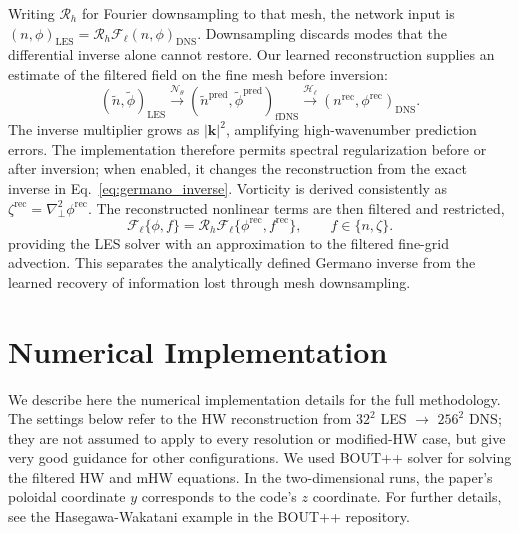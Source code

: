 \documentclass[authoryear,preprint,review,12pt]{elsarticle}
\begin{document}
Writing $\mathcal{R}_h$ for Fourier downsampling to that mesh, the network input is $(n,\phi)_{\mathrm{LES}}=\mathcal{R}_h\mathcal{F}_\ell(n,\phi)_{\mathrm{DNS}}$. Downsampling discards modes that the differential inverse alone cannot restore. Our learned reconstruction supplies an estimate of the filtered field on the fine mesh before inversion:
\begin{equation}
    (\widetilde{n},\widetilde{\phi})_{\mathrm{LES}}
    \xrightarrow{\mathcal{N}_\theta}
    (\widetilde n^{\mathrm{pred}},\widetilde\phi^{\mathrm{pred}})_{\mathrm{fDNS}}
    \xrightarrow{\mathcal{H}_\ell}
    (n^{\mathrm{rec}},\phi^{\mathrm{rec}})_{\mathrm{DNS}}.
    \label{eq:germano_learning_path}
\end{equation}
The inverse multiplier grows as $|\mathbf{k}|^2$, amplifying high-wavenumber prediction errors. The implementation therefore permits spectral regularization before or after inversion; when enabled, it changes the reconstruction from the exact inverse in Eq.~\eqref{eq:germano_inverse}. Vorticity is derived consistently as $\zeta^{\mathrm{rec}}=\nabla_\perp^2\phi^{\mathrm{rec}}$. The reconstructed nonlinear terms are then filtered and restricted,
\begin{equation}
    \mathcal{F}_\ell\{\phi,f\}
    =\mathcal{R}_h\mathcal{F}_\ell
      \{\phi^{\mathrm{rec}},f^{\mathrm{rec}}\},
      \qquad f\in\{n,\zeta\}.
\end{equation}
providing the LES solver with an approximation to the filtered fine-grid advection. This separates the analytically defined Germano inverse from the learned recovery of information lost through mesh downsampling.
%
%
%
%
%
%
%
\section{Numerical Implementation}\label{sec:NumericalImplementation}
We describe here the numerical implementation details for the full methodology. The settings below refer to the HW reconstruction from $32^2$ LES $\to$ $256^2$ DNS; they are not assumed to apply to every resolution or modified-HW case, but give very good guidance for other configurations. We used BOUT++ solver \citep{dudson_bout++_2009} for solving the filtered HW and mHW equations. In the two-dimensional runs, the paper's poloidal coordinate $y$ corresponds to the code's $z$ coordinate. For further details, see the Hasegawa-Wakatani example in the BOUT++ repository.
\end{document}
